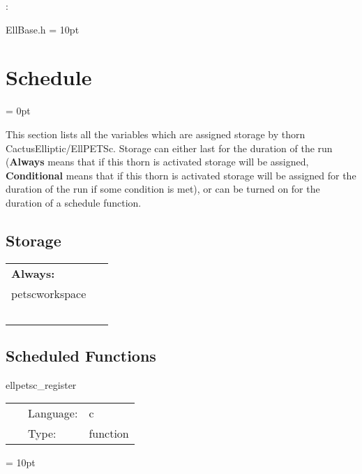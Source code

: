 \documentclass{article}
\begin{document}
\vspace{5mm}

: 

EllBase.h
\vspace{2mm}\parskip = 10pt 

\section{Schedule} 


\parskip = 0pt


\noindent This section lists all the variables which are assigned storage by thorn CactusElliptic/EllPETSc.  Storage can either last for the duration of the run ({\bf Always} means that if this thorn is activated storage will be assigned, {\bf Conditional} means that if this thorn is activated storage will be assigned for the duration of the run if some condition is met), or can be turned on for the duration of a schedule function.


\subsection*{Storage}

\hspace{5mm}

 \begin{tabular*}{160mm}{ll} 

{\bf Always:}&  ~ \\ 
 petscworkspace & ~\\ 
~ & ~\\ 
\end{tabular*} 


\subsection*{Scheduled Functions}
\vspace{5mm}


\hspace{5mm} ellpetsc\_register 

\hspace{5mm}{\it register the petsc solvers } 


\hspace{5mm}

 \begin{tabular*}{160mm}{cll} 
~ & Language:  & c \\ 
~ & Type:  & function \\ 
\end{tabular*} 



\vspace{5mm}\parskip = 10pt 
\end{document}
